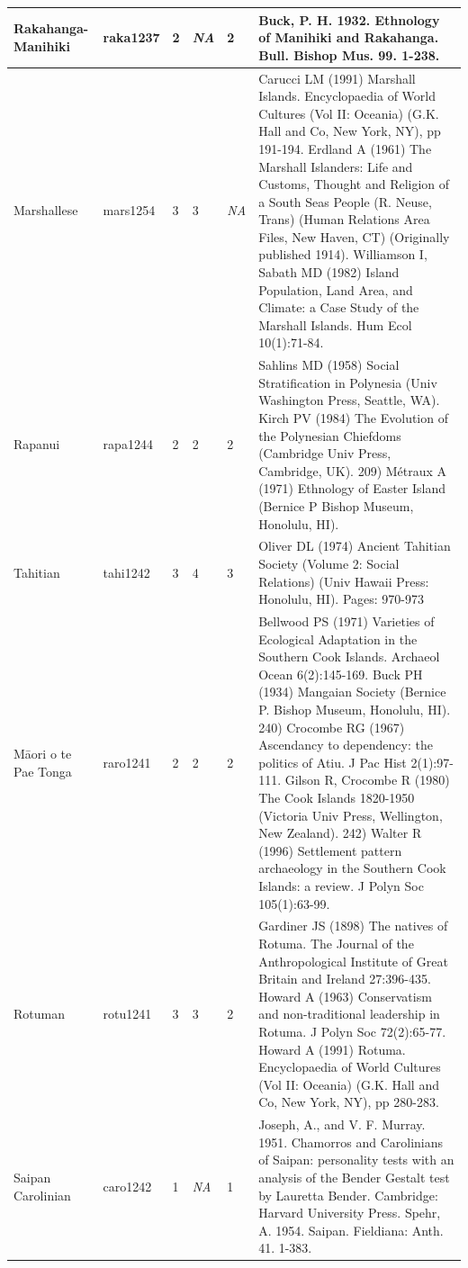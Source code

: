 \documentclass[a4paper,10pt]{article} %
\begin{document}
\begin{landscape}
\begin{longtable}{ | p{2cm}| p{2cm}| p{1.8cm}| p{1.8cm}| p{3cm}| p{9cm}| }
Rakahanga-Manihiki&raka1237&2&\emph{NA}&2&Buck, P. H. 1932. Ethnology of Manihiki and Rakahanga. Bull. Bishop Mus. 99. 1-238.\\ \hline
Marshallese&mars1254&3&3&\emph{NA}&Carucci LM (1991) Marshall Islands. Encyclopaedia of World Cultures (Vol II: Oceania) (G.K. Hall and Co, New York, NY), pp 191-194. Erdland A (1961) The Marshall Islanders: Life and Customs, Thought and Religion of a South Seas People (R. Neuse, Trans) (Human Relations Area Files, New Haven, CT) (Originally published 1914). Williamson I, Sabath MD (1982) Island Population, Land Area, and Climate: a Case Study of the Marshall Islands. Hum Ecol 10(1):71-84. \\ \hline
Rapanui&rapa1244&2&2&2&Sahlins MD (1958) Social Stratification in Polynesia (Univ Washington Press, Seattle, WA). Kirch PV (1984) The Evolution of the Polynesian Chiefdoms (Cambridge Univ Press, Cambridge, UK). 209) M\'{e}traux A (1971) Ethnology of Easter Island (Bernice P Bishop Museum, Honolulu, HI).\\ \hline
Tahitian&tahi1242&3&4&3&Oliver DL (1974) Ancient Tahitian Society (Volume 2: Social Relations) (Univ Hawaii Press: Honolulu, HI). Pages: 970-973\\ \hline
﻿Māori o te Pae Tonga&raro1241&2&2&2&Bellwood PS (1971) Varieties of Ecological Adaptation in the Southern Cook Islands. Archaeol Ocean 6(2):145-169. Buck PH (1934) Mangaian Society (Bernice P. Bishop Museum, Honolulu, HI). 240) Crocombe RG (1967) Ascendancy to dependency: the politics of Atiu. J Pac Hist 2(1):97-111. Gilson R, Crocombe R (1980) The Cook Islands 1820-1950 (Victoria Univ Press, Wellington, New Zealand). 242) Walter R (1996) Settlement pattern archaeology in the Southern Cook Islands: a review. J Polyn Soc 105(1):63-99. \\ \hline
Rotuman&rotu1241&3&3&2&Gardiner JS (1898) The natives of Rotuma. The Journal of the Anthropological Institute of Great Britain and Ireland 27:396-435. Howard A (1963) Conservatism and non-traditional leadership in Rotuma. J Polyn Soc 72(2):65-77. Howard A (1991) Rotuma. Encyclopaedia of World Cultures (Vol II: Oceania) (G.K. Hall and Co, New York, NY), pp 280-283. \\ \hline
Saipan Carolinian&caro1242&1&\emph{NA}&1&Joseph, A., and V. F. Murray. 1951. Chamorros and Carolinians of Saipan: personality tests with an analysis of the Bender Gestalt test by Lauretta Bender. Cambridge: Harvard University Press. Spehr, A. 1954. Saipan. Fieldiana: Anth. 41. 1-383.\\ \hline

\end{longtable}
\end{landscape}
\end{document}
